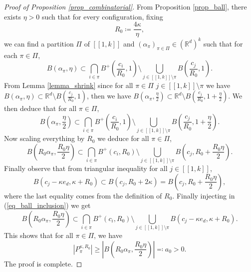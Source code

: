 \documentclass[a4paper, 11pt]{article}
\theoremstyle{plain}
\theoremstyle{definition}
\newcommand{\R}{\mathbb{R}}
\newcommand{\range}[2]{[\![#1,#2]\!]}
\numberwithin{equation}{section}
\begin{document}
\begin{proof}[Proof of Proposition \ref{prop_combinatorial}]
    From Proposition \ref{prop_ball}, there exists $\eta>0$ such that for every configuration, fixing 
        \[R_0\coloneqq\frac{4\kappa}{\eta},\]
    we can find a partition $\Pi$ of $\range{1}{k}$ and $(\alpha_\pi)_{\pi\in\Pi}\in(\R^d)^k$ such that for each $\pi\in\Pi$, 
        \[B(\alpha_\pi,\eta)\subset\bigcap_{i\in\pi} B^+\left(\frac{c_i}{R_0}, 1\right)\setminus\bigcup_{j\in\range{1}{k}\setminus\pi} B\left(\frac{c_j}{R_0}, 1\right).\]
    From Lemma \ref{lemma_shrink} since for all $\pi\in\Pi$ $j\in\range{1}{k}\setminus\pi$ we have $B(\alpha_\pi, \eta)\subset \R^d\setminus B(\frac{c_j}{R_0},1)$, then we have $B(\alpha_\pi, \frac{\eta}{2})\subset\R^d \setminus B(\frac{c_j}{R_0},1+\frac{\eta}{2})$. We then deduce that for all $\pi\in\Pi$,
        \[B\left(\alpha_\pi,\frac{\eta}{2}\right)\subset\bigcap_{i\in\pi} B^+\left(\frac{c_i}{R_0}, 1\right)\setminus\bigcup_{j\in\range{1}{k}\setminus\pi} B\left(\frac{c_j}{R_0}, 1+\frac{\eta}{2}\right).\]
    Now scaling everything by $R_0$ we deduce for all $\pi\in\Pi$,
        \begin{equation}
            \label{eq_ball_inclusion}
            B\left(R_0\alpha_\pi,\frac{R_0\eta}{2}\right)\subset\bigcap_{i\in\pi} B^+\left(c_i, R_0\right)\setminus\bigcup_{j\in\range{1}{k}\setminus\pi} B\left(c_j, R_0+\frac{R_0\eta}{2}\right).
        \end{equation}
    Finally observe that from triangular inequality for all $j\in\range{1}{k}$,
        \[B(c_j-\kappa e_d,\kappa+R_0)\subset B(c_j, R_0+2\kappa)=B\left(c_j, R_0+\frac{R_0\eta}{2}\right),\]
    where the last equality comes from the definition of $R_0$. Finally injecting in (\ref{eq_ball_inclusion}) we get
        \[B\left(R_0\alpha_\pi,\frac{R_0\eta}{2}\right)\subset\bigcap_{i\in\pi} B^+(c_i, R_0)\setminus\bigcup_{j\in\range{1}{k}\setminus\pi} B(c_j-\kappa e_d, \kappa+R_0).\]
    This shows that for all $\pi\in\Pi$, we have
        \[|P^{\kappa, R_0}_\pi|\geq\left|B\left(R_0\alpha_\pi,\frac{R_0\eta}{2}\right)\right|\eqqcolon a_0>0.\]
    The proof is complete.
\end{proof}



\end{document}
